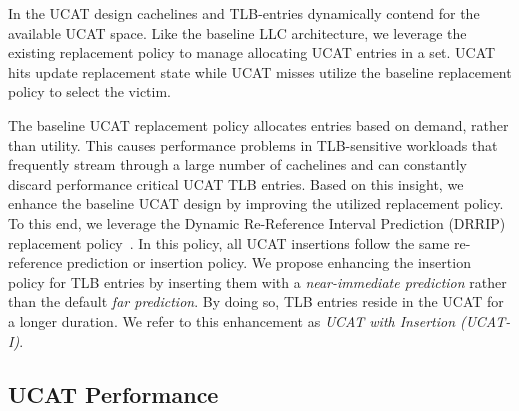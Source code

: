In the UCAT design cachelines and TLB-entries dynamically contend for 
the available UCAT space. Like the
baseline LLC architecture, we leverage the existing replacement policy
to manage allocating UCAT entries in a set. UCAT hits update
replacement state while UCAT misses utilize the baseline replacement
policy to select the victim.

The baseline UCAT replacement policy allocates entries based on
demand, rather than utility. This causes performance problems in TLB-sensitive workloads that
frequently stream through a large number of cachelines and can constantly
discard performance critical UCAT TLB entries. Based on this insight,
we enhance the baseline UCAT design by improving the utilized
replacement policy. To this end, we leverage the Dynamic Re-Reference
Interval Prediction (DRRIP) replacement policy~\cite{}. In this
policy, all UCAT insertions follow the same re-reference prediction
or insertion policy. We propose enhancing the insertion policy
for TLB entries by inserting them with a {\em near-immediate
prediction} rather than the default {\em far prediction}. By doing so,
TLB entries reside in the UCAT for a longer duration.
We refer to this enhancement as {\em UCAT with Insertion (UCAT-I)}.

% 
% 

\subsection{UCAT Performance}

